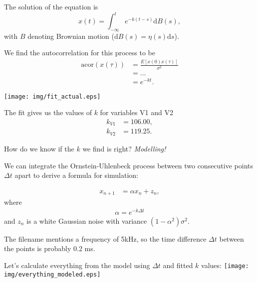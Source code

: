 \documentclass{beamer}
\begin{document}
\begin{frame}
The solution of the equation is
\[
 x(t) = \int_{-\infty}^t e^{-k (t-s)}\mathrm dB(s),
\]
with $B$ denoting Brownian motion ($\mathrm dB(s) = \eta(s)\mathrm ds$).

We find the autocorrelation for this process to be
\begin{align*}
 \mathrm{acor}(x(\tau)) &= \frac{E[x(0)x(\tau)]}{\sigma^2} \\
  &=\dots \\
  &= e^{-kt}.
\end{align*}

\end{frame}

\begin{frame}
\centering
\texttt{[image: img/fit\_actual.eps]}

The fit gives us the values of $k$ for variables V1 and V2
\begin{align*}
 k_{V1} &= 106.00,\\
 k_{V2} &= 119.25.
\end{align*}

\end{frame}

\begin{frame}
How do we know if the $k$ we find is right? \emph{Modelling!}

We can integrate the Ornstein-Uhlenbeck process between two consecutive points $\Delta t$ apart to derive a formula for simulation:

\begin{align*}
x_{n+1} &= \alpha x_n + z_n,
\end{align*}
where
\begin{align*}
 \alpha = e^{-k \Delta t}
\end{align*}
and $z_n$ is a white Gaussian noise with variance $(1-\alpha^2) \sigma^2$.

The filename mentions a frequency of 5kHz, so the time difference $\Delta t$ between the points is probably 0.2 ms.
\end{frame}

\begin{frame}
Let's calculate everything from the model using $\Delta t$ and fitted $k$ values:
\centering
\texttt{[image: img/everything\_modeled.eps]}\\

\end{frame}
\end{document}
